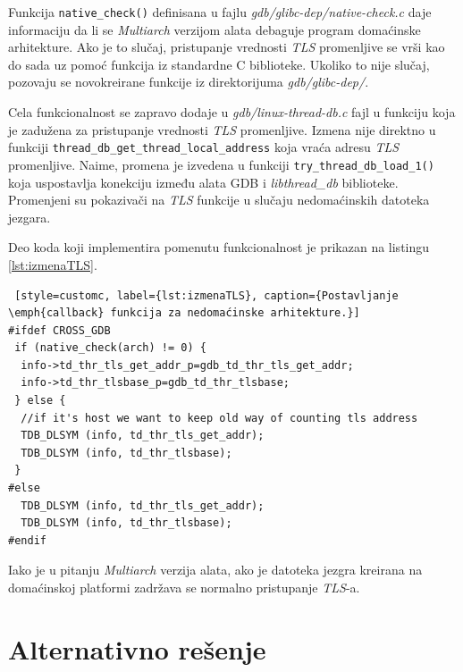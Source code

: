 \documentclass[12pt,oneside]{memoir}
\begin{document}
Funkcija \texttt{native\_check()} definisana u fajlu \emph{gdb/glibc-dep/native-check.c} daje informaciju da li se \emph{Multiarch} verzijom alata debaguje program domaćinske arhitekture. Ako je to slučaj, pristupanje vrednosti \emph{TLS} promenljive se vrši kao do sada uz pomoć funkcija iz standardne C biblioteke. Ukoliko to nije slučaj, pozovaju se novokreirane funkcije iz direktorijuma \emph{gdb/glibc-dep/}.

Cela funkcionalnost se zapravo dodaje u \emph{gdb/linux-thread-db.c} fajl u funkciju koja je zadužena za pristupanje vrednosti \emph{TLS} promenljive. Izmena nije direktno u funkciji \texttt{thread\_db\_get\_thread\_local\_address} koja vraća adresu \emph{TLS} promenljive. Naime, promena je izvedena u funkciji \texttt{try\_thread\_db\_load\_1()} koja uspostavlja konekciju između alata GDB i \emph{libthread\_db} biblioteke. Promenjeni su pokazivači na \emph{TLS} funkcije u slučaju nedomaćinskih datoteka jezgara.

Deo koda koji implementira pomenutu funkcionalnost je prikazan na listingu \ref{lst:izmenaTLS}.
\begin{lstlisting} [style=customc, label={lst:izmenaTLS}, caption={Postavljanje \emph{callback} funkcija za nedomaćinske arhitekture.}]
#ifdef CROSS_GDB
 if (native_check(arch) != 0) {
  info->td_thr_tls_get_addr_p=gdb_td_thr_tls_get_addr;
  info->td_thr_tlsbase_p=gdb_td_thr_tlsbase;
 } else {
  //if it's host we want to keep old way of counting tls address
  TDB_DLSYM (info, td_thr_tls_get_addr);
  TDB_DLSYM (info, td_thr_tlsbase);
 }
#else
  TDB_DLSYM (info, td_thr_tls_get_addr);
  TDB_DLSYM (info, td_thr_tlsbase);
#endif
\end{lstlisting}
Iako je u pitanju \emph{Multiarch} verzija alata, ako je datoteka jezgra kreirana na domaćinskoj platformi zadržava se normalno pristupanje \emph{TLS}-a.

\section{Alternativno rešenje}
\end{document}
